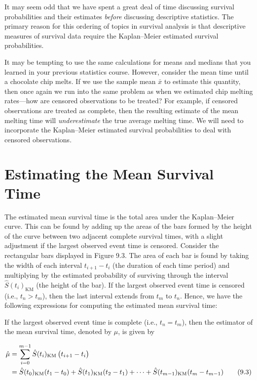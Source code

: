 \documentclass[
]{report}
\begin{document}
It may seem odd that we have spent a great deal of time discussing survival probabilities and their estimates \emph{before} discussing descriptive statistics. The primary reason for this ordering of topics in survival analysis is that descriptive measures of survival data require the Kaplan--Meier estimated survival probabilities.

It may be tempting to use the same calculations for means and medians that you learned in your previous statistics course. However, consider the mean time until a chocolate chip melts. If we use the sample mean \(\bar x\) to estimate this quantity, then once again we run into the same problem as when we estimated chip melting rates---how are censored observations to be treated? For example, if censored observations are treated as complete, then the resulting estimate of the mean melting time will \emph{underestimate} the true average melting time. We will need to incorporate the Kaplan--Meier estimated survival probabilities to deal with censored observations.

\section*{Estimating the Mean Survival Time}\label{estimating-the-mean-survival-time}

The estimated mean survival time is the total area under the Kaplan--Meier curve. This can be found by adding up the areas of the bars formed by the height of the curve between two adjacent complete survival times, with a slight adjustment if the largest observed event time is censored. Consider the rectangular bars displayed in Figure 9.3. The area of each bar is found by taking the width of each interval \(t_{i+1} - t_i\) (the duration of each time period) and multiplying by the estimated probability of surviving through the interval \(\hat S(t_i)_{\mathrm{KM}}\) (the height of the bar). If the largest observed event time is censored (i.e., \(t_n > t_m\)), then the last interval extends from \(t_m\) to \(t_n\). Hence, we have the following expressions for computing the estimated mean survival time:

If the largest observed event time is complete (i.e., \(t_n = t_m\)), then the estimator of the mean survival time, denoted by \(\hat \mu\), is given by

\begin{align}\label{9.3}
\hat \mu 
&= \sum_{i=0}^{m-1} \hat S(t_i)_{\mathrm{KM}} \,\bigl(t_{i+1} - t_i\bigr) \notag \\
&= \hat S(t_0)_{\mathrm{KM}}(t_1 - t_0) + \hat S(t_1)_{\mathrm{KM}}(t_2 - t_1) + \dots + \hat S(t_{m-1})_{\mathrm{KM}}(t_m - t_{m-1})
\tag{9.3}
\end{align}
\end{document}
